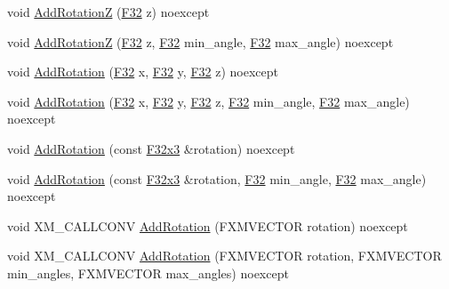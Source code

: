 \begin{DoxyCompactItemize}
\item 
void \mbox{\hyperlink{classmage_1_1_s1_e_t_transform3_d_a588b0fac636e8c20fb761153e8dbb486}{Add\+RotationZ}} (\mbox{\hyperlink{namespacemage_aa97e833b45f06d60a0a9c4fc22ae02c0}{F32}} z) noexcept
\item 
void \mbox{\hyperlink{classmage_1_1_s1_e_t_transform3_d_a812af32f65a3d0caf0698882cda55a6d}{Add\+RotationZ}} (\mbox{\hyperlink{namespacemage_aa97e833b45f06d60a0a9c4fc22ae02c0}{F32}} z, \mbox{\hyperlink{namespacemage_aa97e833b45f06d60a0a9c4fc22ae02c0}{F32}} min\+\_\+angle, \mbox{\hyperlink{namespacemage_aa97e833b45f06d60a0a9c4fc22ae02c0}{F32}} max\+\_\+angle) noexcept
\item 
void \mbox{\hyperlink{classmage_1_1_s1_e_t_transform3_d_adfd74fbdd37460ad9928836f46cf3df4}{Add\+Rotation}} (\mbox{\hyperlink{namespacemage_aa97e833b45f06d60a0a9c4fc22ae02c0}{F32}} x, \mbox{\hyperlink{namespacemage_aa97e833b45f06d60a0a9c4fc22ae02c0}{F32}} y, \mbox{\hyperlink{namespacemage_aa97e833b45f06d60a0a9c4fc22ae02c0}{F32}} z) noexcept
\item 
void \mbox{\hyperlink{classmage_1_1_s1_e_t_transform3_d_aabd19bc328a4e59d04058987f5988fc7}{Add\+Rotation}} (\mbox{\hyperlink{namespacemage_aa97e833b45f06d60a0a9c4fc22ae02c0}{F32}} x, \mbox{\hyperlink{namespacemage_aa97e833b45f06d60a0a9c4fc22ae02c0}{F32}} y, \mbox{\hyperlink{namespacemage_aa97e833b45f06d60a0a9c4fc22ae02c0}{F32}} z, \mbox{\hyperlink{namespacemage_aa97e833b45f06d60a0a9c4fc22ae02c0}{F32}} min\+\_\+angle, \mbox{\hyperlink{namespacemage_aa97e833b45f06d60a0a9c4fc22ae02c0}{F32}} max\+\_\+angle) noexcept
\item 
void \mbox{\hyperlink{classmage_1_1_s1_e_t_transform3_d_a6731a2f696856ea75a1e703535e33753}{Add\+Rotation}} (const \mbox{\hyperlink{namespacemage_a1e3c7a882af461f161caa1cbddaf1fa2}{F32x3}} \&rotation) noexcept
\item 
void \mbox{\hyperlink{classmage_1_1_s1_e_t_transform3_d_a79e7d4df08644d4894a84be74752b1b0}{Add\+Rotation}} (const \mbox{\hyperlink{namespacemage_a1e3c7a882af461f161caa1cbddaf1fa2}{F32x3}} \&rotation, \mbox{\hyperlink{namespacemage_aa97e833b45f06d60a0a9c4fc22ae02c0}{F32}} min\+\_\+angle, \mbox{\hyperlink{namespacemage_aa97e833b45f06d60a0a9c4fc22ae02c0}{F32}} max\+\_\+angle) noexcept
\item 
void X\+M\+\_\+\+C\+A\+L\+L\+C\+O\+NV \mbox{\hyperlink{classmage_1_1_s1_e_t_transform3_d_a46d8e8414c8b8e42cd0e20c7b0a67fc2}{Add\+Rotation}} (F\+X\+M\+V\+E\+C\+T\+OR rotation) noexcept
\item 
void X\+M\+\_\+\+C\+A\+L\+L\+C\+O\+NV \mbox{\hyperlink{classmage_1_1_s1_e_t_transform3_d_a6bef6cafbf463ac128274d0e28a5f196}{Add\+Rotation}} (F\+X\+M\+V\+E\+C\+T\+OR rotation, F\+X\+M\+V\+E\+C\+T\+OR min\+\_\+angles, F\+X\+M\+V\+E\+C\+T\+OR max\+\_\+angles) noexcept

\end{DoxyCompactItemize}
